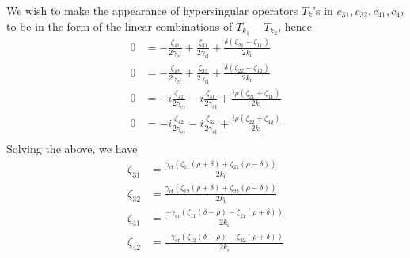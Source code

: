 We wish to make the appearance of hypersingular operators $T_k$'s in $c_{31}, c_{32}, c_{41}, c_{42}$ to be in the form of the linear combinations of $T_{k_1} - T_{k_2}$, hence
\begin{align*}
  0 &= -\frac{\zeta_{41}}{2 \gamma_\text{er}}+\frac{\zeta_{31}}{2 \gamma_\text{el}}+\frac{\delta(\zeta_{21}-\zeta_{11})}{2 k_\text{i}} \\
  0 &= -\frac{\zeta_{42}}{2 \gamma_\text{er}}+\frac{\zeta_{32}}{2 \gamma_\text{el}}+\frac{\delta(\zeta_{22}-\zeta_{12})}{2 k_\text{i}} \\
  0 &= -i\frac{\zeta_{41}}{2 \gamma_\text{er}}-i\frac{\zeta_{31}}{2 \gamma_\text{el}}+\frac{i\rho (\zeta_{21}+\zeta_{11})}{2 k_\text{i}} \\
  0 &= -i\frac{\zeta_{42}}{2 \gamma_\text{er}}-i\frac{\zeta_{32}}{2 \gamma_\text{el}}+\frac{i\rho (\zeta_{22}+\zeta_{12})}{2 k_\text{i}} \\
\end{align*}
Solving the above, we have
\begin{align*}
  \zeta_{31} &= \frac{\gamma_\text{el}\left(\zeta_{11}(\rho + \delta) + \zeta_{21}(\rho - \delta)\right)}{2 k_\text{i}}\\
  \zeta_{32} &= \frac{\gamma_\text{el}\left(\zeta_{12}(\rho + \delta) + \zeta_{22}(\rho - \delta)\right)}{2 k_\text{i}}\\
  \zeta_{41} &= \frac{-\gamma_\text{er}\left(\zeta_{11}(\delta - \rho) - \zeta_{21}(\rho + \delta)\right)}{2 k_\text{i}}\\
  \zeta_{42} &= \frac{-\gamma_\text{er}\left(\zeta_{12}(\delta - \rho) - \zeta_{22}(\rho + \delta)\right)}{2 k_\text{i}}\\
\end{align*}

